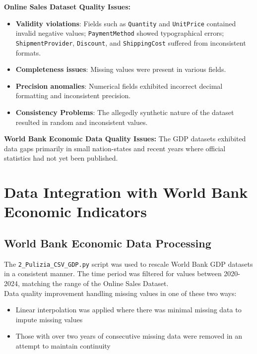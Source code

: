 \documentclass[a4paper,11pt]{article}
\begin{document}
\textbf{Online Sales Dataset Quality Issues:}
\begin{itemize}
    \item \textbf{Validity violations}: Fields such as \texttt{Quantity} and \texttt{UnitPrice} contained invalid negative values; \texttt{PaymentMethod} showed typographical errors; \texttt{ShipmentProvider}, \texttt{Discount}, and \texttt{ShippingCost} suffered from inconsistent formats.

    \item \textbf{Completeness issues}: Missing values were present in various fields.

    \item \textbf{Precision anomalies}: Numerical fields exhibited incorrect decimal formatting and inconsistent precision.

    \item \textbf{Consistency Problems}: The allegedly synthetic nature of the dataset resulted in random and inconsistent values.
\end{itemize}
\textbf{World Bank Economic Data Quality Issues:}
The GDP datasets exhibited data gaps primarily in small nation-states and recent years where official statistics had not yet been published.

\section{Data Integration with World Bank Economic Indicators}

\subsection{World Bank Economic Data Processing}

The \texttt{2\_Pulizia\_CSV\_GDP.py} script was used to rescale World Bank GDP datasets in a consistent manner.
The time period was filtered for values between 2020-2024, matching the range of the Online Sales Dataset. \\
Data quality improvement handling missing values in one of these two ways:
\begin{itemize}
    \item Linear interpolation was applied where there was minimal missing data to impute missing values
    \item Those with over two years of consecutive missing data were removed in an attempt to maintain continuity
\end{itemize}
\end{document}
